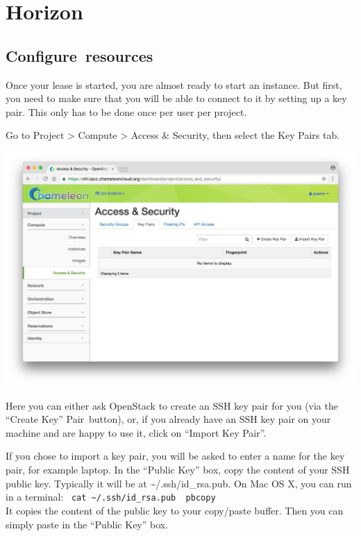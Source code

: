 
\chapter{Horizon}

\section{Configure~resources}\label{configureresources}

Once your lease is started, you are almost ready to start an instance.
But first, you need to make sure that you will be able to connect to it
by setting up a key pair. This only has to be done once per user per
project.

Go to Project \textgreater{} Compute \textgreater{} Access \& Security,
then select the Key Pairs tab.

\includegraphics[width=\columnwidth]{images/chameleon/Screen-Shot-2016-10-26-at-14-37-00.png}

Here you can either ask OpenStack to create an SSH key pair for you (via
the ``Create Key'' Pair~button), or, if you already have an SSH key pair
on your machine and are happy to use it, click on ``Import Key Pair''.

If you chose to import a key pair, you will be asked to enter a name for
the key pair, for example laptop. In the ``Public Key'' box, copy the
content of your SSH public key. Typically it will be at
\textasciitilde{}/.ssh/id\_rsa.pub. On Mac OS X, you can run in a
terminal:
~\texttt{cat\ \textasciitilde{}/.ssh/id\_rsa.pub\ \textbar{}\ pbcopy}\\
It copies the content of the public key to your copy/paste buffer. Then
you can simply paste in the ``Public Key'' box.

